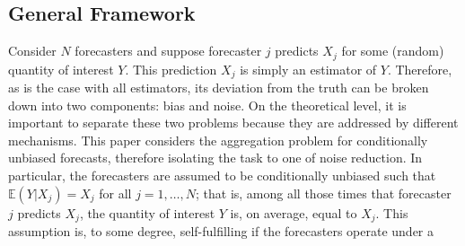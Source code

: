 \documentclass[11pt]{article}
\newcommand{\E}{\mathbb{E}}
\theoremstyle{definition}
\theoremstyle{definition}
\def\E{{\mathbb E}}
\begin{document}
\subsection{General Framework}
\label{context}



Consider $N$ forecasters and suppose forecaster $j$ predicts $X_j$ for some (random) quantity of interest $Y$. This prediction $X_j$ is simply an estimator of $Y$. Therefore, as is the case with all estimators, 
its deviation from the truth can be broken down into two components: bias and noise. On the
theoretical level, it is important to separate these two problems because they are addressed by different mechanisms.  This
paper considers the aggregation problem for conditionally unbiased forecasts,
therefore isolating the task to one of noise reduction. In particular, the forecasters are assumed to be conditionally unbiased such that $\E(Y | X_j) = X_j$ for all $j = 1, \dots, N$; that is, among all those times that forecaster $j$ predicts $X_j$, the quantity of interest $Y$ is, on average, equal to $X_j$. 
%
This assumption is, to some degree, self-fulfilling if the forecasters operate 
 under a 
\end{document}
